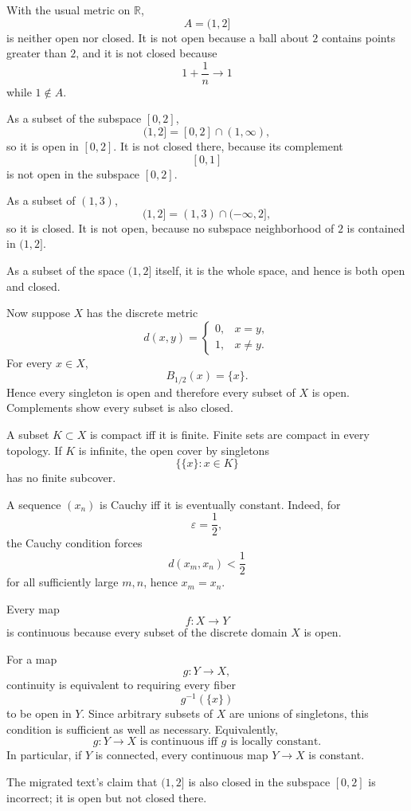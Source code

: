 \begin{solution}
With the usual metric on \(\mathbb R\),
\[
A=(1,2]
\]
is neither open nor closed. It is not open because a ball about \(2\) contains points greater than \(2\), and it is not closed because
\[
1+\frac1n\to1
\]
while \(1\notin A\).

As a subset of the subspace \([0,2]\),
\[
(1,2]
=
[0,2]\cap(1,\infty),
\]
so it is open in \([0,2]\). It is not closed there, because its complement
\[
[0,1]
\]
is not open in the subspace \([0,2]\).

As a subset of \((1,3)\),
\[
(1,2]
=
(1,3)\cap(-\infty,2],
\]
so it is closed. It is not open, because no subspace neighborhood of \(2\) is contained in \((1,2]\).

As a subset of the space \((1,2]\) itself, it is the whole space, and hence is both open and closed.

Now suppose \(X\) has the discrete metric
\[
d(x,y)=
\begin{cases}
0,&x=y,\\
1,&x\neq y.
\end{cases}
\]
For every \(x\in X\),
\[
B_{1/2}(x)=\{x\}.
\]
Hence every singleton is open and therefore every subset of \(X\) is open. Complements show every subset is also closed.

A subset \(K\subset X\) is compact iff it is finite. Finite sets are compact in every topology. If \(K\) is infinite, the open cover by singletons
\[
\{\{x\}:x\in K\}
\]
has no finite subcover.

A sequence \((x_n)\) is Cauchy iff it is eventually constant. Indeed, for
\[
\varepsilon=\frac12,
\]
the Cauchy condition forces
\[
d(x_m,x_n)<\frac12
\]
for all sufficiently large \(m,n\), hence \(x_m=x_n\).

Every map
\[
f:X\to Y
\]
is continuous because every subset of the discrete domain \(X\) is open.

For a map
\[
g:Y\to X,
\]
continuity is equivalent to requiring every fiber
\[
g^{-1}(\{x\})
\]
to be open in \(Y\). Since arbitrary subsets of \(X\) are unions of singletons, this condition is sufficient as well as necessary. Equivalently,
\[
\boxed{g:Y\to X\text{ is continuous iff }g\text{ is locally constant}.}
\]
In particular, if \(Y\) is connected, every continuous map \(Y\to X\) is constant.

The migrated text's claim that \((1,2]\) is also closed in the subspace \([0,2]\) is incorrect; it is open but not closed there.
\end{solution}



